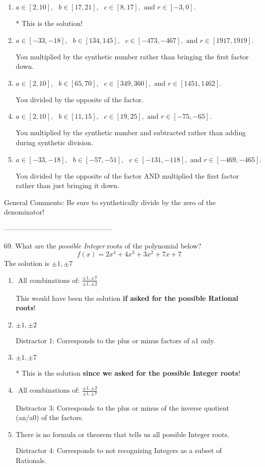 \documentclass{extbook}[14pt]
\begin{document}
\begin{enumerate}[label=\Alph*.] 
\item $ a \in [2, 10], \text{   } b \in [17, 21], \text{   } c \in [8, 17], \text{   and   } r \in [-3, 0]. $ 

 * This is the solution! 
\item $ a \in [-33, -18], \text{   } b \in [134, 145], \text{   } c \in [-473, -467], \text{   and   } r \in [1917, 1919]. $ 

  You multiplied by the synthetic number rather than bringing the first factor down. 
\item $ a \in [2, 10], \text{   } b \in [65, 70], \text{   } c \in [349, 360], \text{   and   } r \in [1451, 1462]. $ 

  You divided by the opposite of the factor. 
\item $ a \in [2, 10], \text{   } b \in [11, 15], \text{   } c \in [19, 25], \text{   and   } r \in [-75, -65]. $ 

  You multiplied by the synthetic number and subtracted rather than adding during synthetic division. 
\item $ a \in [-33, -18], \text{   } b \in [-57, -51], \text{   } c \in [-131, -118], \text{   and   } r \in [-469, -465]. $ 

  You divided by the opposite of the factor AND multiplied the first factor rather than just bringing it down. 
\end{enumerate} 
 
General Comments: Be sure to synthetically divide by the zero of the denominator!

-----------------------------------------------

69. What are the \textit{possible Integer} roots of the polynomial below?
\[ f(x) = 2x^{4} +4 x^{3} +3 x^{2} +7 x + 7 \] 
The solution is $ \pm 1,\pm 7 $ 

\begin{enumerate}[label=\Alph*.] 
\item $ \text{ All combinations of: }\frac{\pm 1,\pm 7}{\pm 1,\pm 2} $ 

 This would have been the solution \textbf{if asked for the possible Rational roots}! 
\item $ \pm 1,\pm 2 $ 

  Distractor 1: Corresponds to the plus or minus factors of a1 only. 
\item $ \pm 1,\pm 7 $ 

 * This is the solution \textbf{since we asked for the possible Integer roots}! 
\item $ \text{ All combinations of: }\frac{\pm 1,\pm 2}{\pm 1,\pm 7} $ 

  Distractor 3: Corresponds to the plus or minus of the inverse quotient (an/a0) of the factors.  
\item $ \text{There is no formula or theorem that tells us all possible Integer roots.} $ 

  Distractor 4: Corresponds to not recognizing Integers as a subset of Rationals. 
\end{enumerate} 
 
\end{document}
